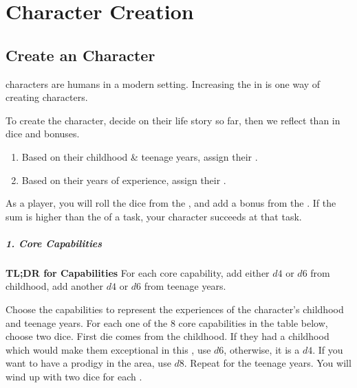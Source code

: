 \chapterspaceabove{2.75cm}
\chapterspacebelow{5.25cm}


\chapter{Character Creation}

\section{Create an  Character}

\label{sec:character_creation}

\begin{marginNote}
	 characters are humans in a modern setting.
	Increasing the  in 
	is one way of creating  characters.
\end{marginNote}
To create the character, decide on their life story so far,
then we reflect than in dice and bonuses.
\begin{enumerate}
	\item Based on their childhood \& teenage years, assign their .
	\item Based on their years of experience, assign their .
\end{enumerate}

As a player, you will roll the dice from the ,
and add a bonus from the .
If the sum is higher than the  of a task,
your character succeeds at that task.

\paragraph*{1. Core Capabilities}

\begin{marginNote}
	\textbf{TL;DR for Capabilities}
	For each core capability,
	add either $d4$ or $d6$ from childhood,
	add another $d4$ or $d6$ from teenage years.
\end{marginNote}

Choose the capabilities to represent the experiences of the character's childhood and teenage years.
For each one of the 8 core capabilities in the table below, choose two dice.
First die comes from the childhood. If they had a childhood which would
make them exceptional in this , use $d6$, otherwise, it is a $d4$.
If you want to have a prodigy in the area, use $d8$.
Repeat for the teenage years. You will wind up with
two dice for each .

